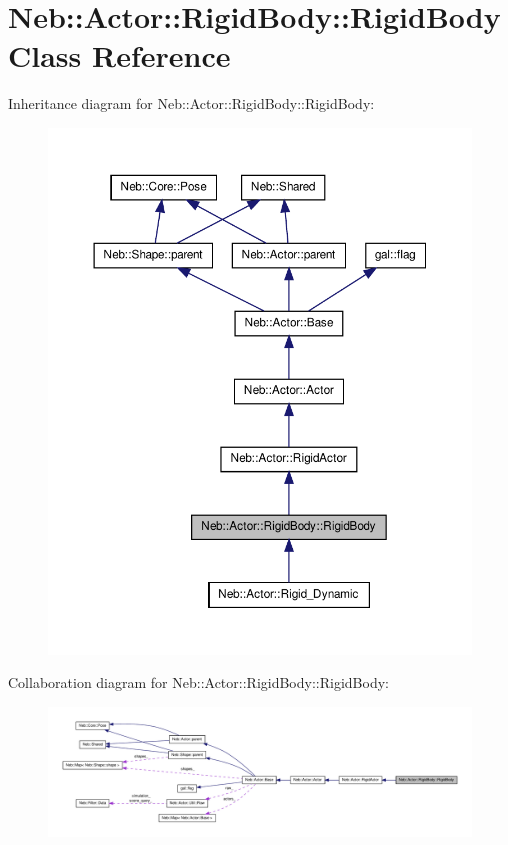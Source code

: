 \hypertarget{classNeb_1_1Actor_1_1RigidBody_1_1RigidBody}{\section{\-Neb\-:\-:\-Actor\-:\-:\-Rigid\-Body\-:\-:\-Rigid\-Body \-Class \-Reference}
\label{classNeb_1_1Actor_1_1RigidBody_1_1RigidBody}
}


\-Inheritance diagram for \-Neb\-:\-:\-Actor\-:\-:\-Rigid\-Body\-:\-:\-Rigid\-Body\-:\nopagebreak
\begin{figure}[H]
\begin{center}
\leavevmode
\includegraphics[width=350pt]{classNeb_1_1Actor_1_1RigidBody_1_1RigidBody__inherit__graph}
\end{center}
\end{figure}


\-Collaboration diagram for \-Neb\-:\-:\-Actor\-:\-:\-Rigid\-Body\-:\-:\-Rigid\-Body\-:\nopagebreak
\begin{figure}[H]
\begin{center}
\leavevmode
\includegraphics[width=350pt]{classNeb_1_1Actor_1_1RigidBody_1_1RigidBody__coll__graph}
\end{center}
\end{figure}
